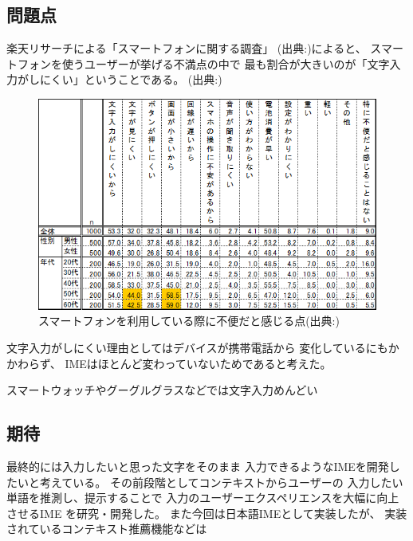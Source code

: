 \subsection{問題点}
楽天リサーチによる「スマートフォンに関する調査」
(出典:\cite{rakutensmartphone})によると、
スマートフォンを使うユーザーが挙げる不満点の中で
最も割合が大きいのが「文字入力がしにくい」ということである。
(出典:\cite{rakutensmartphone})
\begin{figure}[htbp]
  \begin{center}
    \includegraphics[width=140mm,bb=0 0 589 368]{images/dissatisfaction.png}
    \caption{スマートフォンを利用している際に不便だと感じる点(出典:\cite{rakutensmartphone})}
    \label{fig:dissatisfaction}
  \end{center}
\end{figure}
文字入力がしにくい理由としてはデバイスが携帯電話から
変化しているにもかかわらず、
IMEはほとんど変わっていないためであると考えた。


スマートウォッチやグーグルグラスなどでは文字入力めんどい

\subsection{期待}
最終的には入力したいと思った文字をそのまま
入力できるようなIMEを開発したいと考えている。
その前段階としてコンテキストからユーザーの
入力したい単語を推測し、提示することで
入力のユーザーエクスペリエンスを大幅に向上させるIME
を研究・開発した。
また今回は日本語IMEとして実装したが、
実装されているコンテキスト推薦機能などは
